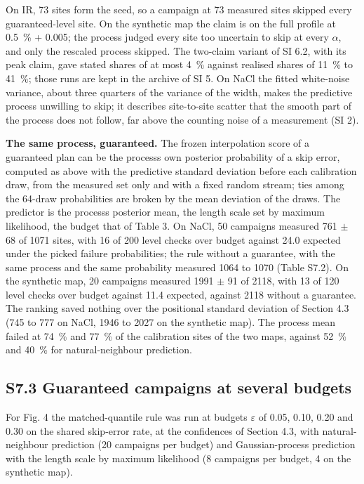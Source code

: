 \documentclass{iopjournal}
\begin{document}
On IR, 73 sites form the seed, so a campaign at 73 measured sites skipped every guaranteed-level site. On the synthetic map the claim is on the full profile at 0.5~\% + 0.005; the process judged every site too uncertain to skip at every \ensuremath{\alpha}, and only the rescaled process skipped. The two-claim variant of SI 6.2, with its peak claim, gave stated shares of at most 4~\% against realised shares of 11~\% to 41~\%; those runs are kept in the archive of SI 5. On NaCl the fitted white-noise variance, about three quarters of the variance of the width, makes the predictive process unwilling to skip; it describes site-to-site scatter that the smooth part of the process does not follow, far above the counting noise of a measurement (SI 2).

\textbf{The same process, guaranteed.} The frozen interpolation score of a guaranteed plan can be the process\textquotesingle s own posterior probability of a skip error, computed as above with the predictive standard deviation before each calibration draw, from the measured set only and with a fixed random stream; ties among the 64-draw probabilities are broken by the mean deviation of the draws. The predictor is the process\textquotesingle s posterior mean, the length scale set by maximum likelihood, the budget that of Table 3. On NaCl, 50 campaigns measured 761 \ensuremath{\pm} 68 of 1071 sites, with 16 of 200 level checks over budget against 24.0 expected under the picked failure probabilities; the rule without a guarantee, with the same process and the same probability measured 1064 to 1070 (Table S7.2). On the synthetic map, 20 campaigns measured 1991 \ensuremath{\pm} 91 of 2118, with 13 of 120 level checks over budget against 11.4 expected, against 2118 without a guarantee. The ranking saved nothing over the positional standard deviation of Section 4.3 (745 to 777 on NaCl, 1946 to 2027 on the synthetic map). The process mean failed at 74~\% and 77~\% of the calibration sites of the two maps, against 52~\% and 40~\% for natural-neighbour prediction.

\hypertarget{s7.3-guaranteed-campaigns-at-several-budgets}{%
\subsection*{S7.3 Guaranteed campaigns at several budgets}\label{s7.3-guaranteed-campaigns-at-several-budgets}}

For Fig. 4 the matched-quantile rule was run at budgets \(\varepsilon\) of 0.05, 0.10, 0.20 and 0.30 on the shared skip-error rate, at the confidences of Section 4.3, with natural-neighbour prediction (20 campaigns per budget) and Gaussian-process prediction with the length scale by maximum likelihood (8 campaigns per budget, 4 on the synthetic map).
\end{document}
